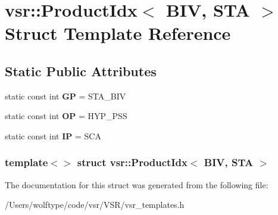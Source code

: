 \hypertarget{structvsr_1_1_product_idx_3_01_b_i_v_00_01_s_t_a_01_4}{\section{vsr\-:\-:Product\-Idx$<$ B\-I\-V, S\-T\-A $>$ Struct Template Reference}
\label{structvsr_1_1_product_idx_3_01_b_i_v_00_01_s_t_a_01_4}
}
\subsection*{Static Public Attributes}
\begin{DoxyCompactItemize}
\item 
\hypertarget{structvsr_1_1_product_idx_3_01_b_i_v_00_01_s_t_a_01_4_ace9be237622b9942ca0eae6441160d20}{static const int {\bfseries G\-P} = S\-T\-A\-\_\-\-B\-I\-V}\label{structvsr_1_1_product_idx_3_01_b_i_v_00_01_s_t_a_01_4_ace9be237622b9942ca0eae6441160d20}

\item 
\hypertarget{structvsr_1_1_product_idx_3_01_b_i_v_00_01_s_t_a_01_4_ac2ba3b393a7e7c09dadc6eaebd949cf8}{static const int {\bfseries O\-P} = H\-Y\-P\-\_\-\-P\-S\-S}\label{structvsr_1_1_product_idx_3_01_b_i_v_00_01_s_t_a_01_4_ac2ba3b393a7e7c09dadc6eaebd949cf8}

\item 
\hypertarget{structvsr_1_1_product_idx_3_01_b_i_v_00_01_s_t_a_01_4_a69456c91045466ba3dd3af1db8cb0e51}{static const int {\bfseries I\-P} = S\-C\-A}\label{structvsr_1_1_product_idx_3_01_b_i_v_00_01_s_t_a_01_4_a69456c91045466ba3dd3af1db8cb0e51}

\end{DoxyCompactItemize}
\subsubsection*{template$<$$>$ struct vsr\-::\-Product\-Idx$<$ B\-I\-V, S\-T\-A $>$}



The documentation for this struct was generated from the following file\-:\begin{DoxyCompactItemize}
\item 
/\-Users/wolftype/code/vsr/\-V\-S\-R/vsr\-\_\-templates.\-h\end{DoxyCompactItemize}
